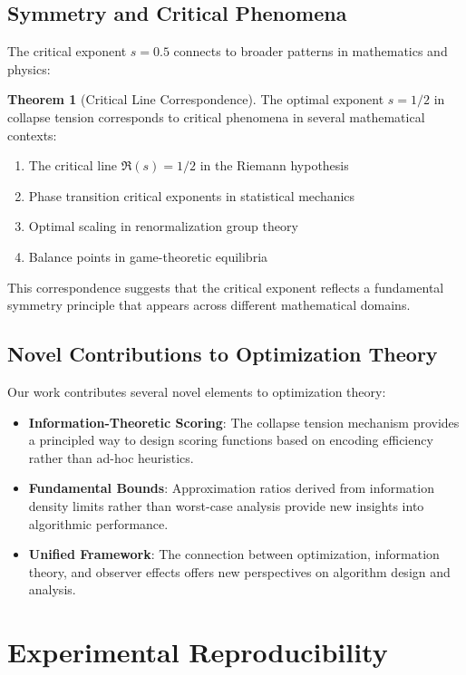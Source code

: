 \documentclass[11pt]{article}
\theoremstyle{remark}
\theoremstyle{definition}
\newtheorem{theorem}{Theorem}
\begin{document}
\subsection{Symmetry and Critical Phenomena}

The critical exponent $s = 0.5$ connects to broader patterns in mathematics and physics:

\begin{theorem}[Critical Line Correspondence]
The optimal exponent $s = 1/2$ in collapse tension corresponds to critical phenomena in several mathematical contexts:
\begin{enumerate}
\item The critical line $\Re(s) = 1/2$ in the Riemann hypothesis
\item Phase transition critical exponents in statistical mechanics
\item Optimal scaling in renormalization group theory
\item Balance points in game-theoretic equilibria
\end{enumerate}
\end{theorem}

This correspondence suggests that the critical exponent reflects a fundamental symmetry principle that appears across different mathematical domains.

\subsection{Novel Contributions to Optimization Theory}

Our work contributes several novel elements to optimization theory:

\begin{itemize}
\item \textbf{Information-Theoretic Scoring}: The collapse tension mechanism provides a principled way to design scoring functions based on encoding efficiency rather than ad-hoc heuristics.
\item \textbf{Fundamental Bounds}: Approximation ratios derived from information density limits rather than worst-case analysis provide new insights into algorithmic performance.
\item \textbf{Unified Framework}: The connection between optimization, information theory, and observer effects offers new perspectives on algorithm design and analysis.
\end{itemize}

\section{Experimental Reproducibility}
\end{document}
